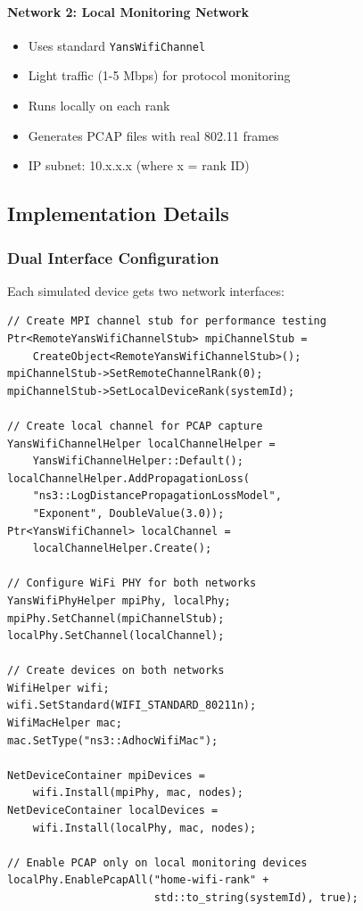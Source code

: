 \paragraph{Network 2: Local Monitoring Network}
\begin{itemize}
    \item Uses standard \texttt{YansWifiChannel}
    \item Light traffic (1-5 Mbps) for protocol monitoring
    \item Runs locally on each rank
    \item Generates PCAP files with real 802.11 frames
    \item IP subnet: 10.x.x.x (where x = rank ID)
\end{itemize}

\subsection{Implementation Details}

\subsubsection{Dual Interface Configuration}

Each simulated device gets two network interfaces:

\begin{lstlisting}[style=cpp, caption={Dual-network device creation}]
// Create MPI channel stub for performance testing
Ptr<RemoteYansWifiChannelStub> mpiChannelStub = 
    CreateObject<RemoteYansWifiChannelStub>();
mpiChannelStub->SetRemoteChannelRank(0);
mpiChannelStub->SetLocalDeviceRank(systemId);

// Create local channel for PCAP capture
YansWifiChannelHelper localChannelHelper = 
    YansWifiChannelHelper::Default();
localChannelHelper.AddPropagationLoss(
    "ns3::LogDistancePropagationLossModel",
    "Exponent", DoubleValue(3.0));
Ptr<YansWifiChannel> localChannel = 
    localChannelHelper.Create();

// Configure WiFi PHY for both networks
YansWifiPhyHelper mpiPhy, localPhy;
mpiPhy.SetChannel(mpiChannelStub);
localPhy.SetChannel(localChannel);

// Create devices on both networks
WifiHelper wifi;
wifi.SetStandard(WIFI_STANDARD_80211n);
WifiMacHelper mac;
mac.SetType("ns3::AdhocWifiMac");

NetDeviceContainer mpiDevices = 
    wifi.Install(mpiPhy, mac, nodes);
NetDeviceContainer localDevices = 
    wifi.Install(localPhy, mac, nodes);

// Enable PCAP only on local monitoring devices
localPhy.EnablePcapAll("home-wifi-rank" + 
                       std::to_string(systemId), true);
\end{lstlisting}

